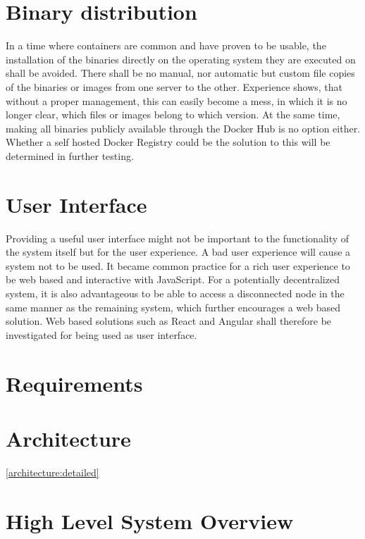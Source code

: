 \section{Binary distribution}

In a time where containers are common and have proven to be usable, the installation of the binaries directly on the operating system they are executed on shall be avoided.
There shall be no manual, nor automatic but custom file copies of the binaries or images from one server to the other.
Experience shows, that without a proper management, this can easily become a mess, in which it is no longer clear, which files or images belong to which version.
At the same time, making all binaries publicly available through the Docker Hub\cite{docker:hub} is no option either.
Whether a self hosted Docker Registry\cite{docker:registry} could be the solution to this will be determined in further testing.

\section{User Interface}

Providing a useful user interface might not be important to the functionality of the system itself but for the user experience.
A bad user experience will cause a system not to be used.
It became common practice for a rich user experience to be web based and interactive with JavaScript.
For a potentially decentralized system, it is also advantageous to be able to access a disconnected node in the same manner as the remaining system, which further encourages a web based solution.
Web based solutions such as React and Angular shall therefore be investigated for being used as user interface.

\section{Requirements}



\section{Architecture}

\autoref{architecture:detailed}

\section{High Level System Overview}


